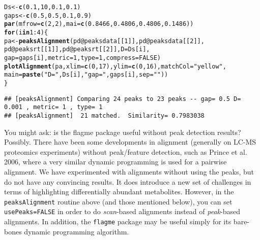 \documentclass{article}\usepackage[]{graphicx}\usepackage[]{color}
\makeatletter
\newcommand{\hlnum}[1]{\textcolor[rgb]{0.686,0.059,0.569}{#1}}%
\newcommand{\hlstr}[1]{\textcolor[rgb]{0.192,0.494,0.8}{#1}}%
\newcommand{\hlopt}[1]{\textcolor[rgb]{0,0,0}{#1}}%
\newcommand{\hlstd}[1]{\textcolor[rgb]{0.345,0.345,0.345}{#1}}%
\newcommand{\hlkwa}[1]{\textcolor[rgb]{0.161,0.373,0.58}{\textbf{#1}}}%
\newcommand{\hlkwb}[1]{\textcolor[rgb]{0.69,0.353,0.396}{#1}}%
\newcommand{\hlkwc}[1]{\textcolor[rgb]{0.333,0.667,0.333}{#1}}%
\newcommand{\hlkwd}[1]{\textcolor[rgb]{0.737,0.353,0.396}{\textbf{#1}}}%
\newenvironment{kframe}{%
 \def\at@end@of@kframe{}%
 \ifinner\ifhmode%
  \def\at@end@of@kframe{\end{minipage}}%
  \begin{minipage}{\columnwidth}%
 \fi\fi%
 \def\FrameCommand##1{\hskip\@totalleftmargin \hskip-\fboxsep
 \colorbox{shadecolor}{##1}\hskip-\fboxsep
     \hskip-\linewidth \hskip-\@totalleftmargin \hskip\columnwidth}%
 \MakeFramed {\advance\hsize-\width
   \@totalleftmargin\z@ \linewidth\hsize
   \@setminipage}}%
 {\par\unskip\endMakeFramed%
 \at@end@of@kframe}
\newenvironment{knitrout}{}{} %
\makeatother
\begin{document}
\begin{knitrout}
\color{fgcolor}\begin{kframe}
\begin{alltt}
\hlstd{Ds} \hlkwb{<-} \hlkwd{c}\hlstd{(}\hlnum{0.1}\hlstd{,} \hlnum{10}\hlstd{,} \hlnum{0.1}\hlstd{,} \hlnum{0.1}\hlstd{)}
\hlstd{gaps} \hlkwb{<-} \hlkwd{c}\hlstd{(}\hlnum{0.5}\hlstd{,} \hlnum{0.5}\hlstd{,} \hlnum{0.1}\hlstd{,} \hlnum{0.9}\hlstd{)}
\hlkwd{par}\hlstd{(}\hlkwc{mfrow}\hlstd{=}\hlkwd{c}\hlstd{(}\hlnum{2}\hlstd{,}\hlnum{2}\hlstd{),} \hlkwc{mai}\hlstd{=}\hlkwd{c}\hlstd{(}\hlnum{0.8466}\hlstd{,}\hlnum{0.4806}\hlstd{,}\hlnum{0.4806}\hlstd{,}\hlnum{0.1486}\hlstd{))}
\hlkwa{for}\hlstd{(i} \hlkwa{in} \hlnum{1}\hlopt{:}\hlnum{4}\hlstd{)\{}
  \hlstd{pa} \hlkwb{<-} \hlkwd{peaksAlignment}\hlstd{(pd}\hlopt{@}\hlkwc{peaksdata}\hlstd{[[}\hlnum{1}\hlstd{]], pd}\hlopt{@}\hlkwc{peaksdata}\hlstd{[[}\hlnum{2}\hlstd{]],}
                       \hlstd{pd}\hlopt{@}\hlkwc{peaksrt}\hlstd{[[}\hlnum{1}\hlstd{]], pd}\hlopt{@}\hlkwc{peaksrt}\hlstd{[[}\hlnum{2}\hlstd{]],} \hlkwc{D}\hlstd{=Ds[i],}
                       \hlkwc{gap}\hlstd{=gaps[i],} \hlkwc{metric}\hlstd{=}\hlnum{1}\hlstd{,} \hlkwc{type}\hlstd{=}\hlnum{1}\hlstd{,} \hlkwc{compress} \hlstd{=} \hlnum{FALSE}\hlstd{)}
  \hlkwd{plotAlignment}\hlstd{(pa,} \hlkwc{xlim}\hlstd{=}\hlkwd{c}\hlstd{(}\hlnum{0}\hlstd{,} \hlnum{17}\hlstd{),} \hlkwc{ylim}\hlstd{=}\hlkwd{c}\hlstd{(}\hlnum{0}\hlstd{,} \hlnum{16}\hlstd{),} \hlkwc{matchCol}\hlstd{=}\hlstr{"yellow"}\hlstd{,}
       \hlkwc{main}\hlstd{=}\hlkwd{paste}\hlstd{(}\hlstr{"D="}\hlstd{, Ds[i],} \hlstr{" gap="}\hlstd{, gaps[i],} \hlkwc{sep}\hlstd{=}\hlstr{""}\hlstd{))}
\hlstd{\}}
\end{alltt}
\begin{verbatim}
## [peaksAlignment] Comparing 24 peaks to 23 peaks -- gap= 0.5 D= 0.001 , metric= 1 , type= 1 
## [peaksAlignment]  21 matched.  Similarity= 0.7983038
\end{verbatim}


{\ttfamily\noindent\bfseries{}}\end{kframe}
\end{knitrout}

You might ask: is the flagme package useful without peak detection
results? Possibly. There have been some developments in alignment
(generally on LC-MS proteomics experiments) without peak/feature
detection, such as Prince et al. 2006, where a very similar dynamic
programming is used for a pairwise alignment. We have experimented
with alignments without using the peaks, but do not have any
convincing results. It does introduce a new set of challenges in terms
of highlighting differentially abundant metabolites. However, in the
\texttt{peaksAlignment} routine above (and those mentioned below), you
can set \texttt{usePeaks=FALSE} in order to do {\em scan}-based
alignments instead of {\em peak}-based alignments. In addition, the
\texttt{flagme} package may be useful simply for its bare-bones
dynamic programming algorithm. 
\end{document}
